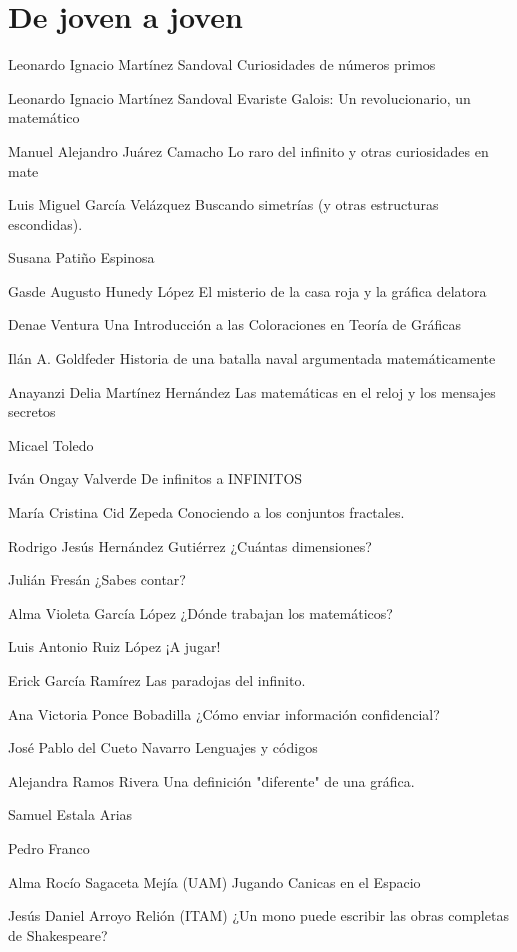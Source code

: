 \section{De joven a joven}

Leonardo Ignacio Martínez Sandoval
Curiosidades de números primos

Leonardo Ignacio Martínez Sandoval
Evariste Galois: Un revolucionario, un matemático

Manuel Alejandro Juárez Camacho
Lo raro del infinito y otras curiosidades en mate

Luis Miguel García Velázquez
Buscando simetrías (y otras estructuras escondidas).

Susana Patiño Espinosa

Gasde Augusto Hunedy López
El misterio de la casa roja y la gráfica delatora

Denae Ventura
Una Introducción a las Coloraciones en Teoría de Gráficas

Ilán A. Goldfeder
Historia de una batalla naval argumentada matemáticamente

Anayanzi Delia Martínez Hernández
Las matemáticas en el reloj y los mensajes secretos

Micael Toledo

Iván Ongay Valverde
De infinitos a INFINITOS

María Cristina Cid Zepeda
Conociendo a los conjuntos fractales.

Rodrigo Jesús Hernández Gutiérrez
¿Cuántas dimensiones?

Julián Fresán
¿Sabes contar?

Alma Violeta García López
¿Dónde trabajan los matemáticos?

Luis Antonio Ruiz López
¡A jugar!

Erick García Ramírez
Las paradojas del infinito.

Ana Victoria Ponce Bobadilla
¿Cómo enviar información confidencial?

José Pablo del Cueto Navarro
Lenguajes y códigos

Alejandra Ramos Rivera
Una definición "diferente" de una gráfica.

Samuel Estala Arias

Pedro Franco

Alma Rocío Sagaceta Mejía  (UAM)
Jugando Canicas en el Espacio

Jesús Daniel Arroyo Relión (ITAM)
¿Un mono puede escribir las obras completas de Shakespeare?
